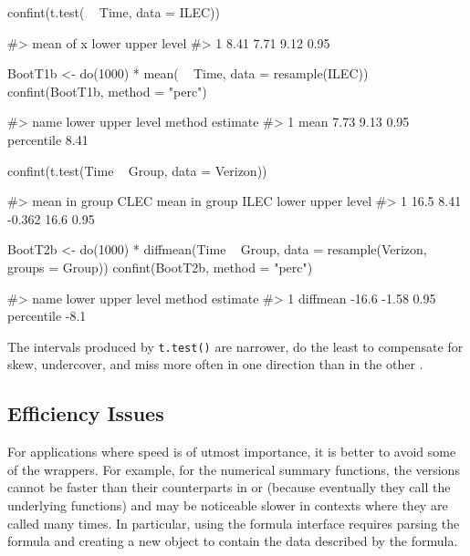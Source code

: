 \begin{Schunk}
\begin{Sinput}
confint(t.test( ~ Time, data = ILEC))
\end{Sinput}
\begin{Soutput}
#>   mean of x lower upper level
#> 1      8.41  7.71  9.12  0.95
\end{Soutput}
\begin{Sinput}
BootT1b <- 
  do(1000) * mean( ~ Time, data = resample(ILEC))
confint(BootT1b, method = "perc")
\end{Sinput}
\begin{Soutput}
#>   name lower upper level     method estimate
#> 1 mean  7.73  9.13  0.95 percentile     8.41
\end{Soutput}
\begin{Sinput}
confint(t.test(Time ~ Group, data = Verizon))
\end{Sinput}
\begin{Soutput}
#>   mean in group CLEC mean in group ILEC  lower upper level
#> 1               16.5               8.41 -0.362  16.6  0.95
\end{Soutput}
\begin{Sinput}
BootT2b <- 
  do(1000) * diffmean(Time ~ Group, data = resample(Verizon, groups = Group))
confint(BootT2b, method = "perc")
\end{Sinput}
\begin{Soutput}
#>       name lower upper level     method estimate
#> 1 diffmean -16.6 -1.58  0.95 percentile     -8.1
\end{Soutput}
\end{Schunk}

\noindent
The intervals produced by \texttt{t.test()} are narrower, do the least
to compensate for skew, undercover, and miss more often in one direction
than in the other \citep{Hesterberg:2015}.

\subsection{Efficiency Issues}\label{efficiency-issues}

For applications where speed is of utmost importance, it is better to
avoid some of the  wrappers. For example, for the numerical
summary functions, the  versions cannot be faster than their
counterparts in  or  (because eventually they call
the underlying functions) and may be noticeable slower in contexts where
they are called many times. In particular, using the formula interface
requires parsing the formula and creating a new object to contain the
data described by the formula.

